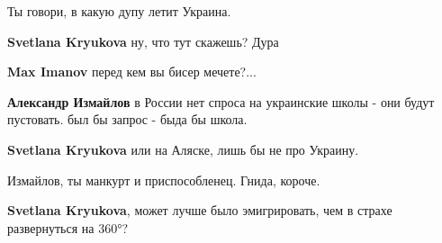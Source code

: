 \begin{itemize}
\begin{itemize}
Ты говори, в какую дупу летит Украина.

 
\textbf{Svetlana Kryukova} ну, что тут скажешь? Дура

 
\textbf{Max Imanov} перед кем вы бисер мечете?...

 
\textbf{Александр Измайлов} в России нет спроса на украинские школы - они будут пустовать. был бы запрос - быда бы школа.

 
\textbf{Svetlana Kryukova} или на Аляске, лишь бы не про Украину.

 
Измайлов, ты манкурт и приспособленец. Гнида, короче.

 
\textbf{Svetlana Kryukova}, может лучше было эмигрировать, чем в страхе развернуться на 360°?

 

\end{itemize}
\end{itemize}
